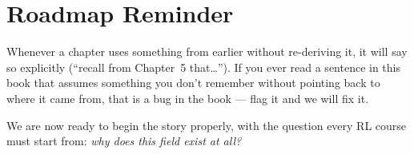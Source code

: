 \section{Roadmap Reminder}

Whenever a chapter uses something from earlier without re-deriving it, it
will say so explicitly (``recall from Chapter~5 that\dots''). If you ever
read a sentence in this book that assumes something you don't remember
without pointing back to where it came from, that is a bug in the
book — flag it and we will fix it.

We are now ready to begin the story properly, with the question every RL
course must start from: \emph{why does this field exist at all?}
